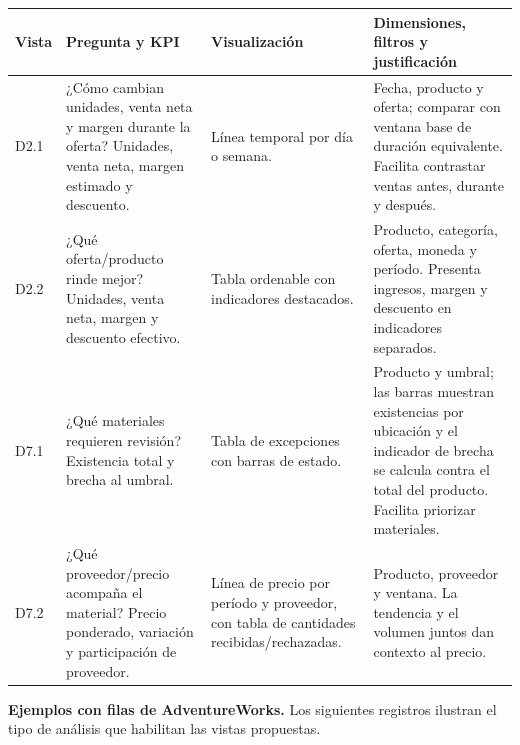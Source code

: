 \documentclass[10pt,a4paper]{article}
\begin{document}
\small
\begin{longtable}{p{}p{}p{}p{}}
\toprule
\textbf{Vista} & \textbf{Pregunta y KPI} & \textbf{Visualización} &
\textbf{Dimensiones, filtros y justificación}\\
\midrule
\endhead
D2.1 & ¿Cómo cambian unidades, venta neta y margen durante la oferta? Unidades,
venta neta, margen estimado y descuento. & Línea temporal por día o semana. &
Fecha, producto y oferta; comparar con ventana base de duración equivalente.
Facilita contrastar ventas antes, durante y después.\\
D2.2 & ¿Qué oferta/producto rinde mejor? Unidades, venta neta, margen y
descuento efectivo. & Tabla ordenable con indicadores destacados. & Producto,
categoría, oferta, moneda y período. Presenta ingresos, margen y descuento
en indicadores separados.\\
D7.1 & ¿Qué materiales requieren revisión? Existencia total y brecha al
umbral. & Tabla de excepciones con barras de estado. & Producto y umbral; las
barras muestran existencias por ubicación y el indicador de brecha se calcula
contra el total del producto. Facilita priorizar materiales.\\
D7.2 & ¿Qué proveedor/precio acompaña el material? Precio ponderado,
variación y participación de proveedor. & Línea de precio por período y
proveedor, con tabla de cantidades recibidas/rechazadas. & Producto,
proveedor y ventana. La tendencia y el volumen juntos dan contexto al precio.\\
\bottomrule
\end{longtable}
\normalsize

\textbf{Ejemplos con filas de AdventureWorks.} Los siguientes registros
ilustran el tipo de análisis que habilitan las vistas propuestas.
\end{document}
